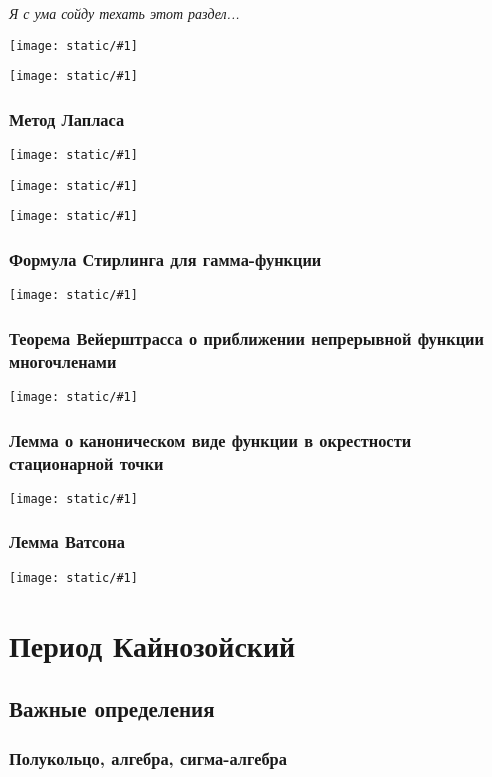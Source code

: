 \documentclass{article}
\def\imageh#1{\texttt{[image: static/\#1]}}
\begin{document}
\textit{Я с ума сойду техать этот раздел...}

\imageh{loc_lapl_1.jpg}

\imageh{loc_lapl_2.jpg}

\subsubsection{Метод Лапласа}

\imageh{met_lapl_1.jpg}

\imageh{met_lapl_2.jpg}

\imageh{met_lapl_3.jpg}

\subsubsection{Формула Стирлинга для гамма-функции}

\imageh{stirl_gamm.jpg}

\subsubsection{Теорема Вейерштрасса о приближении непрерывной функции многочленами}

\imageh{veiersht_lap.jpg}

\subsubsection{Лемма о каноническом виде функции в окрестности стационарной точки}

\imageh{kanon_vd.jpg}

\subsubsection{Лемма Ватсона}

\imageh{watson_l.jpg}

\newpage

\section{Период Кайнозойский}
\subsection{Важные определения}

\subsubsection{Полукольцо, алгебра, сигма-алгебра}
\end{document}

